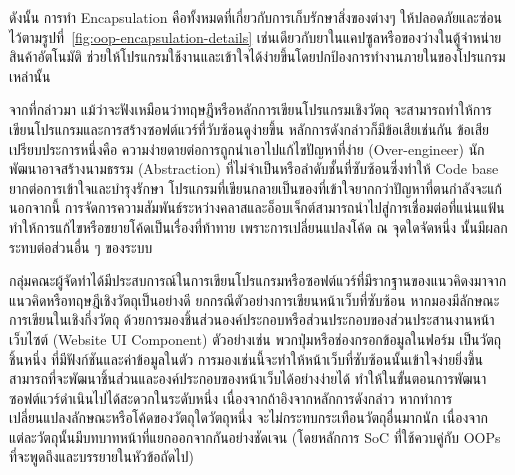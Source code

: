 \documentclass[12pt,one side,openright,a4paper]{cpe-thesis-th}
\newcommand{\thaijustify}[1]{%
  \par\hspace{30pt}\justifying
  #1
}
\begin{document}
            \thaijustify{
                ดังนั้น การทำ Encapsulation คือทั้งหมดที่เกี่ยวกับการเก็บรักษาสิ่งของต่างๆ ให้ปลอดภัยและซ่อนไว้ตามรูปที่~\ref{fig:oop-encapsulation-details} เช่นเดียวกับยาในแคปซูลหรือของว่างในตู้จำหน่ายสินค้าอัตโนมัติ ช่วยให้โปรแกรมใช้งานและเข้าใจได้ง่ายขึ้นโดยปกป้องการทำงานภายในของโปรแกรมเหล่านั้น~\cite{nishad22encapsulation}
            }
            \thaijustify{
                จากที่กล่าวมา แม้ว่าจะฟังเหมือนว่าทฤษฎีหรือหลักการเขียนโปรแกรมเชิงวัตถุ จะสามารถทำให้การเขียนโปรแกรมและการสร้างซอฟต์แวร์ที่วับซ้อนดูง่ายขึ้น หลักการดังกล่าวก็มีข้อเสียเช่นกัน ข้อเสียเปรียบประการหนึ่งคือ ความง่ายดายต่อการถูกนำเอาไปแก้ไขปัญหาที่ง่าย (Over-engineer) นักพัฒนาอาจสร้างนามธรรม (Abstraction) ที่ไม่จำเป็นหรือลำดับชั้นที่ซับซ้อนซึ่งทำให้ Code base ยากต่อการเข้าใจและบำรุงรักษา โปรแกรมที่เขียนกลายเป็นของที่เข้าใจยากกว่าปัญหาที่ตนกำลังจะแก้~\cite{thomas99pragmatic} นอกจากนี้ การจัดการความสัมพันธ์ระหว่างคลาสและอ็อบเจ็กต์สามารถนำไปสู่การเชื่อมต่อที่แน่นแฟ้น ทำให้การแก้ไขหรือขยายโค้ดเป็นเรื่องที่ท้าทาย เพราะการเปลี่ยนแปลงโค้ด ณ จุดใดจัดหนึ่ง นั้นมีผลกระทบต่อส่วนอื่น ๆ ของระบบ~\cite{fowler13oop}
            }
            \thaijustify{
                กลุ่มคณะผู้จัดทำได้มีประสบการณ์ในการเขียนโปรแกรมหรือซอฟต์แวร์ที่มีรากฐานของแนวคิดงมาจากแนวคิดหรือทฤษฎีเชิงวัตถุเป็นอย่างดี ยกกรณีตัวอย่างการเขียนหน้าเว็บที่ซับซ้อน หากมองมีลักษณะการเขียนในเชิงกึ่งวัตถุ ด้วยการมองชิ้นส่วนองค์ประกอบหรือส่วนประกอบของส่วนประสานงานหน้าเว็บไซต์ (Website UI Component) ตัวอย่างเช่น พวกปุ่มหรือช่องกรอกข้อมูลในฟอร์ม เป็นวัตถุชิ้นหนึ่ง ที่มีฟังก์ชันและค่าข้อมูลในตัว การมองเช่นนี้จะทำให้หน้าเว็บที่ซับซ้อนนั้นเข้าใจง่ายยิ่งขึ้น สามารถที่จะพัฒนาชิ้นส่วนและองค์ประกอบของหน้าเว็บได้อย่างง่ายได้ ทำให้ในขั้นตอนการพัฒนาซอฟต์แวร์ดำเนินไปได้สะดวกในระดับหนึ่ง เนื่องจากถ้าอิงจากหลักการดังกล่าว หากทำการเปลี่ยนแปลงลักษณะหรือโค้ดของวัตถุใดวัตถุหนึ่ง จะไม่กระทบกระเทือนวัตถุอื่นมากนัก เนื่องจากแต่ละวัตถุนั้นมีบทบาทหน้าที่แยกออกจากกันอย่างชัดเจน (โดยหลักการ SoC ที่ใช้ควบคู่กับ OOPs ที่จะพูดถึงและบรรยายในหัวข้อถัดไป)
            }
\end{document}
